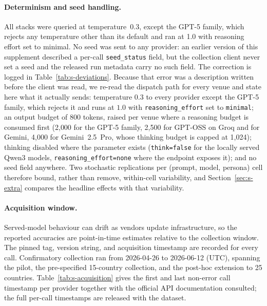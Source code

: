 \documentclass[11pt,a4paper]{article}
\begin{document}
\paragraph{Determinism and seed handling.} All stacks were queried at
temperature~0.3, except the GPT-5 family, which rejects any temperature other
than its default and ran at 1.0 with reasoning effort set to minimal. No seed
was sent to any provider: an earlier version of this supplement described a
per-call \texttt{seed\_status} field, but the collection client never set a
seed and the released run metadata carry no such field. The correction is
logged in Table~\ref{tab:s-deviations}. Because that error was a description
written before the client was read, we re-read the dispatch path for every venue
and state here what it actually sends: temperature $0.3$ to every provider
except the GPT-5 family, which rejects it and runs at $1.0$ with
\texttt{reasoning\_effort} set to \texttt{minimal}; an output budget of 800
tokens, raised per venue where a reasoning budget is consumed first (2{,}000 for
the GPT-5 family, 2{,}500 for GPT-OSS on Groq and for Gemini, 4{,}000 for
Gemini~2.5~Pro, whose thinking budget is capped at 1{,}024); thinking disabled
where the parameter exists (\texttt{think=false} for the locally served Qwen3
models, \texttt{reasoning\_effort=none} where the endpoint exposes it); and no
seed field anywhere. Two stochastic replications per (prompt, model, persona)
cell therefore bound, rather than remove, within-cell variability, and
Section~\ref{sec:s-extra} compares the headline effects with that variability.

\paragraph{Acquisition window.} Served-model behaviour can drift as vendors update
infrastructure, so the reported accuracies are point-in-time estimates relative to
the collection window. The pinned tag, version string, and acquisition timestamp
are recorded for every call. Confirmatory collection ran from
2026-04-26 to 2026-06-12 (UTC), spanning the pilot, the pre-specified
15-country collection, and the post-hoc extension to 25 countries.
Table~\ref{tab:s-acquisition} gives the first and last non-error call timestamp
per provider together with the official API documentation consulted; the full
per-call timestamps are released with the dataset.



\end{document}

